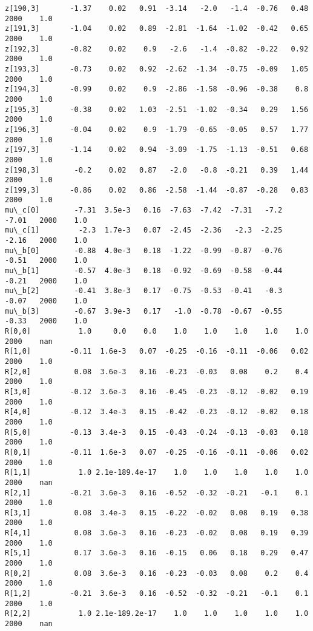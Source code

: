 \documentclass[11pt]{article}
\begin{document}
\begin{Verbatim}[commandchars=\\\{\}]
z[190,3]       -1.37    0.02   0.91  -3.14   -2.0   -1.4  -0.76   0.48   2000    1.0
z[191,3]       -1.04    0.02   0.89  -2.81  -1.64  -1.02  -0.42   0.65   2000    1.0
z[192,3]       -0.82    0.02    0.9   -2.6   -1.4  -0.82  -0.22   0.92   2000    1.0
z[193,3]       -0.73    0.02   0.92  -2.62  -1.34  -0.75  -0.09   1.05   2000    1.0
z[194,3]       -0.99    0.02    0.9  -2.86  -1.58  -0.96  -0.38    0.8   2000    1.0
z[195,3]       -0.38    0.02   1.03  -2.51  -1.02  -0.34   0.29   1.56   2000    1.0
z[196,3]       -0.04    0.02    0.9  -1.79  -0.65  -0.05   0.57   1.77   2000    1.0
z[197,3]       -1.14    0.02   0.94  -3.09  -1.75  -1.13  -0.51   0.68   2000    1.0
z[198,3]        -0.2    0.02   0.87   -2.0   -0.8  -0.21   0.39   1.44   2000    1.0
z[199,3]       -0.86    0.02   0.86  -2.58  -1.44  -0.87  -0.28   0.83   2000    1.0
mu\_c[0]        -7.31  3.5e-3   0.16  -7.63  -7.42  -7.31   -7.2  -7.01   2000    1.0
mu\_c[1]         -2.3  1.7e-3   0.07  -2.45  -2.36   -2.3  -2.25  -2.16   2000    1.0
mu\_b[0]        -0.88  4.0e-3   0.18  -1.22  -0.99  -0.87  -0.76  -0.51   2000    1.0
mu\_b[1]        -0.57  4.0e-3   0.18  -0.92  -0.69  -0.58  -0.44  -0.21   2000    1.0
mu\_b[2]        -0.41  3.8e-3   0.17  -0.75  -0.53  -0.41   -0.3  -0.07   2000    1.0
mu\_b[3]        -0.67  3.9e-3   0.17   -1.0  -0.78  -0.67  -0.55  -0.33   2000    1.0
R[0,0]           1.0     0.0    0.0    1.0    1.0    1.0    1.0    1.0   2000    nan
R[1,0]         -0.11  1.6e-3   0.07  -0.25  -0.16  -0.11  -0.06   0.02   2000    1.0
R[2,0]          0.08  3.6e-3   0.16  -0.23  -0.03   0.08    0.2    0.4   2000    1.0
R[3,0]         -0.12  3.6e-3   0.16  -0.45  -0.23  -0.12  -0.02   0.19   2000    1.0
R[4,0]         -0.12  3.4e-3   0.15  -0.42  -0.23  -0.12  -0.02   0.18   2000    1.0
R[5,0]         -0.13  3.4e-3   0.15  -0.43  -0.24  -0.13  -0.03   0.18   2000    1.0
R[0,1]         -0.11  1.6e-3   0.07  -0.25  -0.16  -0.11  -0.06   0.02   2000    1.0
R[1,1]           1.0 2.1e-189.4e-17    1.0    1.0    1.0    1.0    1.0   2000    nan
R[2,1]         -0.21  3.6e-3   0.16  -0.52  -0.32  -0.21   -0.1    0.1   2000    1.0
R[3,1]          0.08  3.4e-3   0.15  -0.22  -0.02   0.08   0.19   0.38   2000    1.0
R[4,1]          0.08  3.6e-3   0.16  -0.23  -0.02   0.08   0.19   0.39   2000    1.0
R[5,1]          0.17  3.6e-3   0.16  -0.15   0.06   0.18   0.29   0.47   2000    1.0
R[0,2]          0.08  3.6e-3   0.16  -0.23  -0.03   0.08    0.2    0.4   2000    1.0
R[1,2]         -0.21  3.6e-3   0.16  -0.52  -0.32  -0.21   -0.1    0.1   2000    1.0
R[2,2]           1.0 2.1e-189.2e-17    1.0    1.0    1.0    1.0    1.0   2000    nan

\end{Verbatim}
\end{document}
